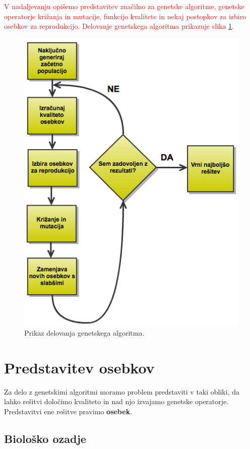 \documentclass[a4paper, 12pt]{book}
\begin{document}
\textcolor{red}{V nadaljevanju opi\v semo predstavitev zna\v cilno za genetske algoritme, genetske operatorje kri\v zanja in mutacije, funkcijo kvalitete in nekaj postopkov za izbiro osebkov za reprodukcijo.
Delovanje genetskega algoritma prikazuje slika \ref{fig:izvajanje_ga}.}
\begin{figure}
\begin{center}
\includegraphics[scale=0.70]{izvajanje_ga.png}
\end{center}
\caption{Prikaz delovanja genetskega algoritma.}
\label{fig:izvajanje_ga}
\end{figure}

\section{Predstavitev osebkov}
\label{seq:predstavitev osebkov}
Za delo z genetskimi algoritmi moramo problem predstaviti v taki obliki, da lahko re\v sitvi dolo\v cimo kvaliteto in nad njo izvajamo genetske operatorje.
Predstavitvi ene re\v sitve pravimo \textbf{osebek}.

\subsection{Biolo\v sko ozadje}
\end{document}
